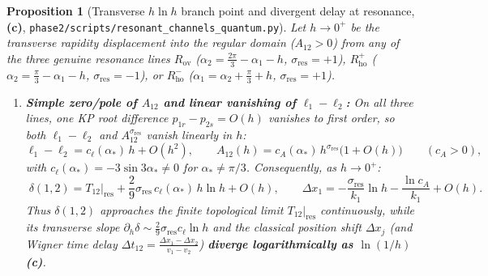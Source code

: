 \documentclass[11pt,a4paper]{article}
\newcommand{\Lc}{\textsf{\textbf{(c)}}\xspace}
\newcommand{\squant}{\texttt{phase2/\allowbreak scripts/\allowbreak resonant\_\allowbreak channels\_\allowbreak quantum.py}}
\newtheorem{proposition}{Proposition}[section]
\theoremstyle{remark}
\begin{document}
\begin{proposition}[Transverse $h\ln h$ branch point and divergent delay at resonance, \Lc, \squant]\label{prop:phase_resonance}
Let $h \to 0^+$ be the transverse rapidity displacement into the regular domain
($A_{12} > 0$) from any of the three genuine resonance lines $R_{\mathrm{ov}}$
($\alpha_2 = \frac{2\pi}{3}-\alpha_1-h$, $\sigma_{\mathrm{res}}=+1$),
$R_{\mathrm{ho}}^+$ ($\alpha_2 = \frac{\pi}{3}-\alpha_1-h$, $\sigma_{\mathrm{res}}=-1$),
or $R_{\mathrm{ho}}^-$ ($\alpha_1 = \alpha_2+\frac{\pi}{3}+h$, $\sigma_{\mathrm{res}}=+1$).
\begin{enumerate}
\item \textbf{Simple zero/pole of $A_{12}$ and linear vanishing of $\ell_1-\ell_2$:}
On all three lines, one KP root difference $p_{1r}-p_{2s} = O(h)$ vanishes to
first order, so both $\ell_1-\ell_2$ and $A_{12}^{\sigma_{\mathrm{res}}}$ vanish
linearly in $h$:
\begin{equation}\label{eq:transverse_asympt}
  \ell_1 - \ell_2 = c_\ell(\alpha_*)\,h + O(h^2), \qquad
  A_{12}(h) = c_A(\alpha_*)\,h^{\sigma_{\mathrm{res}}}\big(1 + O(h)\big) \qquad (c_A > 0),
\end{equation}
with $c_\ell(\alpha_*) = -3\sin 3\alpha_* \ne 0$ for $\alpha_* \ne \pi/3$.
Consequently, as $h \to 0^+$:
\begin{equation}\label{eq:delta_hlnh}
  \boxed{\;
  \delta(1,2) = T_{12}\big|_{\mathrm{res}}
  + \frac{2}{9}\sigma_{\mathrm{res}}\,c_\ell(\alpha_*)\,h\ln h + O(h), \qquad
  \Delta x_1 = -\frac{\sigma_{\mathrm{res}}}{k_1}\ln h - \frac{\ln c_A}{k_1} + O(h).
  \;}
\end{equation}
Thus $\delta(1,2)$ approaches the finite topological limit $T_{12}|_{\mathrm{res}}$
continuously, while its transverse slope $\partial_h\delta \sim \frac{2}{9}\sigma_{\mathrm{res}}c_\ell\ln h$
and the classical position shift $\Delta x_j$ (and Wigner time delay
$\Delta t_{12} = \frac{\Delta x_1 - \Delta x_2}{v_1 - v_2}$) \textbf{diverge
logarithmically as $\ln(1/h)$} \Lc.


\end{enumerate}
\end{proposition}
\end{document}
